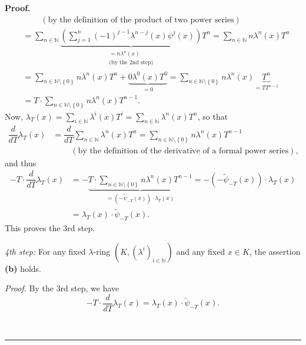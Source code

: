 \documentclass[numbers=enddot,12pt,final,onecolumn,notitlepage]{scrartcl}%
\newenvironment{proof}[1][Proof]{\noindent\textbf{#1.} }{\ \rule{0.5em}{0.5em}}
\begin{document}
\begin{proof}
\begin{align*}
&  \ \ \ \ \ \ \ \ \ \ \left(  \text{by the definition of the product of two
power series}\right) \\
&  =\sum_{n\in\mathbb{N}}\underbrace{\left(  \sum_{j=1}^{n}\left(  -1\right)
^{j-1}\lambda^{n-j}\left(  x\right)  \psi^{j}\left(  x\right)  \right)
}_{\substack{=n\lambda^{n}\left(  x\right)  \\\text{(by the 2nd step)}}%
}T^{n}=\sum_{n\in\mathbb{N}}n\lambda^{n}\left(  x\right)  T^{n}\\
&  =\sum_{n\in\mathbb{N}\setminus\left\{  0\right\}  }n\lambda^{n}\left(
x\right)  T^{n}+\underbrace{0\lambda^{0}\left(  x\right)  T^{0}}_{=0}%
=\sum_{n\in\mathbb{N}\setminus\left\{  0\right\}  }n\lambda^{n}\left(
x\right)  \underbrace{T^{n}}_{=TT^{n-1}}\\
&  =T\cdot\sum_{n\in\mathbb{N}\setminus\left\{  0\right\}  }n\lambda
^{n}\left(  x\right)  T^{n-1}.
\end{align*}
Now, $\lambda_{T}\left(  x\right)  =\sum\limits_{i\in\mathbb{N}}\lambda
^{i}\left(  x\right)  T^{i}=\sum\limits_{n\in\mathbb{N}}\lambda^{n}\left(
x\right)  T^{n}$, so that%
\begin{align*}
\dfrac{d}{dT}\lambda_{T}\left(  x\right)   &  =\dfrac{d}{dT}\sum
\limits_{n\in\mathbb{N}}\lambda^{n}\left(  x\right)  T^{n}=\sum_{n\in
\mathbb{N}\setminus\left\{  0\right\}  }n\lambda^{n}\left(  x\right)
T^{n-1}\\
&  \ \ \ \ \ \ \ \ \ \ \left(  \text{by the definition of the derivative of a
formal power series}\right)  ,
\end{align*}
and thus%
\begin{align*}
-T\cdot\dfrac{d}{dT}\lambda_{T}\left(  x\right)   &  =-\underbrace{T\cdot
\sum_{n\in\mathbb{N}\setminus\left\{  0\right\}  }n\lambda^{n}\left(
x\right)  T^{n-1}}_{=\left(  -\widetilde{\psi}_{-T}\left(  x\right)  \right)
\cdot\lambda_{T}\left(  x\right)  }=-\left(  -\widetilde{\psi}_{-T}\left(
x\right)  \right)  \cdot\lambda_{T}\left(  x\right) \\
&  =\lambda_{T}\left(  x\right)  \cdot\widetilde{\psi}_{-T}\left(  x\right)  .
\end{align*}
This proves the 3rd step.

\textit{4th step:} For any fixed $\lambda$-ring $\left(  K,\left(  \lambda
^{i}\right)  _{i\in\mathbb{N}}\right)  $ and any fixed $x\in K$, the assertion
\textbf{(b)} holds.

\textit{Proof.} By the 3rd step, we have
\[
-T\cdot\dfrac{d}{dT}\lambda_{T}\left(  x\right)  =\lambda_{T}\left(  x\right)
\cdot\widetilde{\psi}_{-T}\left(  x\right)  .
\]



\end{proof}
\end{document}
